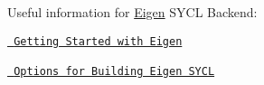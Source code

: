 Useful information for \mbox{\hyperlink{namespaceEigen}{Eigen}} SYCL Backend\+:


\begin{DoxyItemize}
\item \href{https://developer.codeplay.com/computecppce/latest/getting-started-with-eigen}{\texttt{ Getting Started with Eigen}}
\item \href{https://developer.codeplay.com/computecppce/latest/options-for-building-eigen-sycl}{\texttt{ Options for Building Eigen SYCL}} ~\newline
 
\end{DoxyItemize}